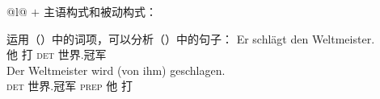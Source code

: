 \ex
\label{ex-schlagen-passive}
\begin{tabular}[t]{@{}l@{}}
 $+$ 主语构式和被动构式：\\
\end{tabular}
\zl
运用（）中的词项，可以分析（）中的句子：
\eal
\label{ex-cxg-weltmeister}
\ex 
\gll Er schlägt den Weltmeister.\\
	 他 打 \textsc{det} 世界.冠军\\
\ex 
\gll Der Weltmeister wird (von ihm) geschlagen.\\
     \textsc{det} 世界.冠军 \passiveprs{} \textsc{prep} 他 打\\
\zl

